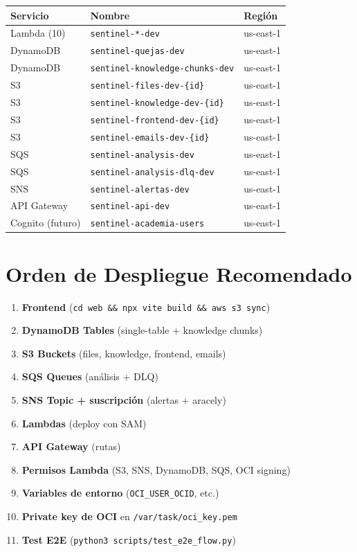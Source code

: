 \documentclass[11pt,a4paper]{article}
\begin{document}
\begin{tcolorbox}[colback=yellow!5, colframe=orange!60, title=\textbf{Resumen de servicios AWS}]
\begin{tabular}{lll}
\toprule
\textbf{Servicio} & \textbf{Nombre} & \textbf{Regi\'on} \\
\midrule
Lambda (10) & \texttt{sentinel-*-dev} & us-east-1 \\
DynamoDB & \texttt{sentinel-quejas-dev} & us-east-1 \\
DynamoDB & \texttt{sentinel-knowledge-chunks-dev} & us-east-1 \\
S3 & \texttt{sentinel-files-dev-\{id\}} & us-east-1 \\
S3 & \texttt{sentinel-knowledge-dev-\{id\}} & us-east-1 \\
S3 & \texttt{sentinel-frontend-dev-\{id\}} & us-east-1 \\
S3 & \texttt{sentinel-emails-dev-\{id\}} & us-east-1 \\
SQS & \texttt{sentinel-analysis-dev} & us-east-1 \\
SQS & \texttt{sentinel-analysis-dlq-dev} & us-east-1 \\
SNS & \texttt{sentinel-alertas-dev} & us-east-1 \\
API Gateway & \texttt{sentinel-api-dev} & us-east-1 \\
Cognito (futuro) & \texttt{sentinel-academia-users} & us-east-1 \\
\bottomrule
\end{tabular}
\end{tcolorbox}

\section{Orden de Despliegue Recomendado}

\begin{enumerate}[leftmargin=*]
  \item \textbf{Frontend} (\texttt{cd web \&\& npx vite build \&\& aws s3 sync})
  \item \textbf{DynamoDB Tables} (single-table + knowledge chunks)
  \item \textbf{S3 Buckets} (files, knowledge, frontend, emails)
  \item \textbf{SQS Queues} (an\'alisis + DLQ)
  \item \textbf{SNS Topic + suscripci\'on} (alertas + aracely)
  \item \textbf{Lambdas} (deploy con SAM)
  \item \textbf{API Gateway} (rutas)
  \item \textbf{Permisos Lambda} (S3, SNS, DynamoDB, SQS, OCI signing)
  \item \textbf{Variables de entorno} (\texttt{OCI\_USER\_OCID}, etc.)
  \item \textbf{Private key de OCI} en \texttt{/var/task/oci\_key.pem}
  \item \textbf{Test E2E} (\texttt{python3 scripts/test\_e2e\_flow.py})
\end{enumerate}
\end{document}
